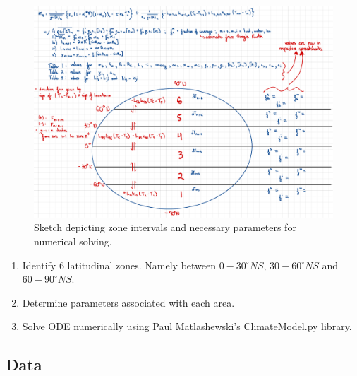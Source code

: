 \documentclass[12pt]{article}
\begin{document}
\begin{figure}[H]
    \centering
    \includegraphics[scale=0.3]{Graphicalg.pdf}
    \caption{
        Sketch depicting zone intervals and necessary parameters for numerical
        solving.
    }
    \label{fig:graphicalg}
\end{figure}
\FloatBarrier

\begin{enumerate}
    \item Identify 6 latitudinal zones. Namely between $0-30^{\circ}NS$,
    $30-60^{\circ}NS$ and $60-90^{\circ}NS$.
    \item Determine parameters associated with each area.
    \item Solve ODE numerically using Paul Matlashewski's
    ClimateModel.py library.  
\end{enumerate}

\subsection{Data}
\end{document}
